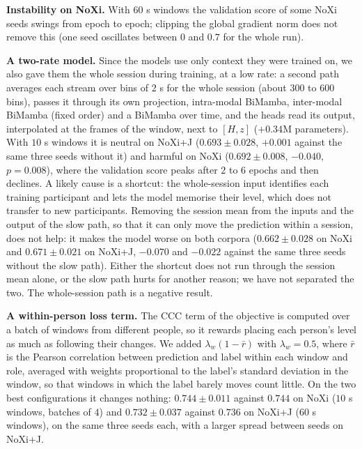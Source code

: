 \documentclass[10pt,a4paper,twocolumn]{article}
\begin{document}
	\textbf{Instability on NoXi.} With $60$ s windows the validation score of some NoXi seeds swings from epoch to epoch; clipping the global gradient norm does not remove this (one seed oscillates between $0$ and $0.7$ for the whole run).

	\textbf{A two-rate model.} Since the models use only context they were trained on, we also gave them the whole session during training, at a low rate: a second path averages each stream over bins of $2$ s for the whole session (about $300$ to $600$ bins), passes it through its own projection, intra-modal BiMamba, inter-modal BiMamba (fixed order) and a BiMamba over time, and the heads read its output, interpolated at the frames of the window, next to $[H, z]$ ($+0.34$M parameters). With $10$ s windows it is neutral on NoXi+J ($0.693 \pm 0.028$, $+0.001$ against the same three seeds without it) and harmful on NoXi ($0.692 \pm 0.008$, $-0.040$, $p = 0.008$), where the validation score peaks after $2$ to $6$ epochs and then declines. A likely cause is a shortcut: the whole-session input identifies each training participant and lets the model memorise their level, which does not transfer to new participants. Removing the session mean from the inputs and the output of the slow path, so that it can only move the prediction within a session, does not help: it makes the model worse on both corpora ($0.662 \pm 0.028$ on NoXi and $0.671 \pm 0.021$ on NoXi+J, $-0.070$ and $-0.022$ against the same three seeds without the slow path). Either the shortcut does not run through the session mean alone, or the slow path hurts for another reason; we have not separated the two. The whole-session path is a negative result.

	\textbf{A within-person loss term.} The CCC term of the objective is computed over a batch of windows from different people, so it rewards placing each person's level as much as following their changes. We added $\lambda_w(1 - \bar r)$ with $\lambda_w = 0.5$, where $\bar r$ is the Pearson correlation between prediction and label within each window and role, averaged with weights proportional to the label's standard deviation in the window, so that windows in which the label barely moves count little. On the two best configurations it changes nothing: $0.744 \pm 0.011$ against $0.744$ on NoXi ($10$ s windows, batches of $4$) and $0.732 \pm 0.037$ against $0.736$ on NoXi+J ($60$ s windows), on the same three seeds each, with a larger spread between seeds on NoXi+J.
\end{document}
